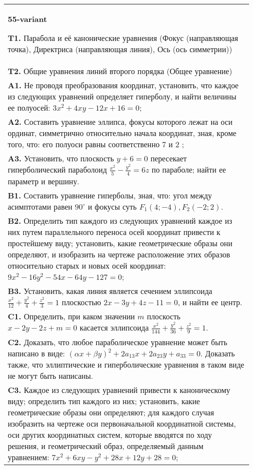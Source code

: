\documentclass{article}
\begin{document}
\begin{tabular}{m{17cm}}
\textbf{55-variant}
\newline

\textbf{T1.} Парабола и её канонические уравнения (Фокус (направляющая точка), Директриса (направляющая линия), Ось (ось симметрии)) \\
\textbf{T2.} Общие уравнения линий второго порядка (Общее уравнение) \\
\textbf{A1.} Не проводя преобразования координат, установить, что каждое из следующих уравнений определяет гиперболу, и найти величины ее полуосей: $3 x^2+4 x y-12 x+16=0$; \\
\textbf{A2.} Составить уравнение эллипса, фокусы которого лежат на оси ординат, симметрично относительно начала координат, зная, кроме того, что: его полуоси равны соответственно 7 и 2 ; \\
\textbf{A3.} Установить, что плоскость $y+6=0$ пересекает гиперболический параболоид $\frac{x^2}{5}-\frac{y^2}{4}=6 z$ по параболе; найти ее параметр и вершину. \\
\textbf{B1.} Составить уравнение гиперболы, зная, что: угол между асимптотами равен $90^{\circ}$ и фокусы суть $F_1(4 ;-4), F_2(-2 ; 2)$. \\
\textbf{B2.} Определить тип каждого из следующих уравнений каждое из них путем параллельного переноса осей координат привести к простейшему виду; установить, какие геометрические образы они определяют, и изобразить на чертеже расположение этих образов относительно старых и новых осей координат: $9 x^2-16 y^2-54 x-64 y-127=0$; \\
\textbf{B3.} Установить, какая линия является сечением эллипсоида $\frac{x^2}{12}+\frac{y^2}{4}+\frac{z^2}{3}=1$ плоскостью $2 x-3 y+4 z-11=0$, и найти ее центр. \\
\textbf{C1.} Определить, при каком значении $m$ плоскость $x-2 y-2 z+m=0$ касается эллипсоида $\frac{x^2}{144}+\frac{y^2}{36}+\frac{z^2}{9}=1$. \\
\textbf{C2.} Доказать, что любое параболическое уравнение может быть написано в виде: $ (\alpha x+\beta y) ^2+2a_{13}x+2a_{23}y+a_{33}=0$. Доказать также, что эллиптические и гиперболические уравнения в таком виде не могут быть написаны. \\
\textbf{C3.} Каждое из следующих уравнений привести к каноническому виду; определить тип каждого из них; установить, какие геометрические образы они определяют; для каждого случая изобразить на чертеже оси первоначальной координатной системы, оси других координатных систем, которые вводятся по ходу решения, и геометрический образ, определяемый данным уравнением: $7 x^2+6 x y-y^2+28 x+12 y+28=0$; \\

\end{tabular}
\vspace{1cm}
\end{document}
